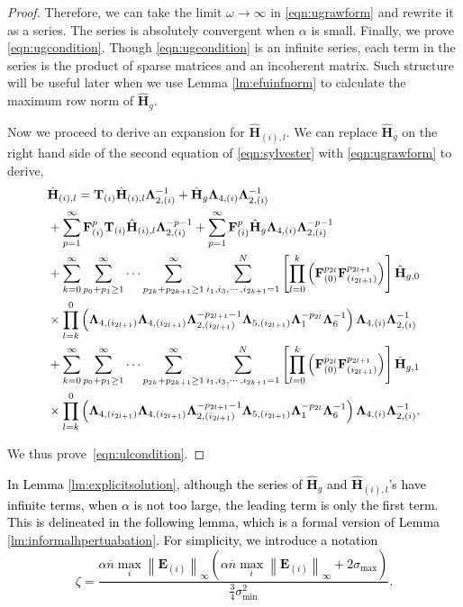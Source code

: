 \documentclass[twoside,11pt]{article}
\newcommand{\revise}[1]{\textcolor{black}{ #1}}
\newcommand{\norm}[1]{\left\lVert#1\right\rVert}
\newcommand{\matE}{\mathbf{E}}
\newcommand{\matF}{\mathbf{F}}
\newcommand{\hmatH}{{\hat{\mathbf{H}}}{}}
\newcommand{\matT}{\mathbf{T}}
\newcommand{\matLambda}{\mathbf{\Lambda}}
\newcommand{\gop}{\sigma_{\max}}
\newcommand{\bn}{{\overline{n}}}
\newcommand{\abnb}{\alpha \bn\max_{i}\norm{\matE_{(i)}}_{\infty}}
\newcommand{\sms}{\sigma_{\min}^2}
\begin{document}
\begin{proof}
Therefore, we can take the limit $\omega\to\infty$ in \eqref{eqn:ugrawform} and rewrite it as a series. The series is absolutely convergent when $\alpha$ is small. Finally, we prove \eqref{eqn:ugcondition}. Though \eqref{eqn:ugcondition} is an infinite series, each term in the series is the product of sparse matrices and an incoherent matrix. Such structure will be useful later when we use Lemma \ref{lm:efuinfnorm} to calculate the maximum row norm of $\hmatH_g$. 

Now we proceed to derive an expansion for $\hmatH_{(i),l}$. We can replace $\hmatH_g$ on the right hand side of the second equation of \eqref{eqn:sylvester} with \eqref{eqn:ugrawform} to derive,
\begin{align}
&\hmatH_{(i),l}=\matT_{(i)}\hmatH_{(i),l}\matLambda_{2,(i)}^{-1}+\hmatH_{g}\matLambda_{4,(i)}\matLambda_{2,(i)}^{-1}\notag\\
&+\sum_{p=1}^{\infty}\matF_{(i)}^p\matT_{(i)}\hmatH_{(i),l}\matLambda_{2,(i)}^{-p-1}+\sum_{p=1}^{\infty}\matF_{(i)}^p\hmatH_{g}\matLambda_{4,(i)}\matLambda_{2,(i)}^{-p-1}\notag\\
&+\sum_{k=0}^\infty\sum_{p_0+p_1\ge 1}^{\infty}\cdots\sum_{p_{2k}+p_{2k+1}\ge 1}^{\infty}\sum_{i_1,i_3,\cdots,i_{2k+1}=1}^N\left[\prod_{l=0}^{k}\left(\matF_{(0)}^{p_{2l}}\matF_{(i_{2l+1})}^{p_{2l+1}}\right)\right]\hmatH_{g,0}\notag\\
&\times \prod_{l=k}^0\left(\matLambda_{4,(i_{2l+1})}\matLambda_{4,(i_{2l+1})}\matLambda_{2,(i_{2l+1})}^{-p_{2l+1}-1}\matLambda_{5,(i_{2l+1})}\matLambda_{1}^{-p_{2l}}\matLambda_6^{-1}\right)\matLambda_{4,(i)}\matLambda_{2,(i)}^{-1}\notag\\
&+\sum_{k=0}^\infty\sum_{p_0+p_1\ge 1}^{\infty}\cdots\sum_{p_{2k}+p_{2k+1}\ge 1}^{\infty}\sum_{i_1,i_3,\cdots,i_{2k+1}=1}^N\left[\prod_{l=0}^{k}\left(\matF_{(0)}^{p_{2l}}\matF_{(i_{2l+1})}^{p_{2l+1}}\right)\right]\hmatH_{g,1}\notag\\
&\times \prod_{l=k}^0\left(\matLambda_{4,(i_{2l+1})}\matLambda_{4,(i_{2l+1})}\matLambda_{2,(i_{2l+1})}^{-p_{2l+1}-1}\matLambda_{5,(i_{2l+1})}\matLambda_{1}^{-p_{2l}}\matLambda_6^{-1}\right)\matLambda_{4,(i)}\matLambda_{2,(i)}^{-1}.\notag\\
\label{eqn:uirawform}
\end{align}

We thus prove~\eqref{eqn:ulcondition}.
\end{proof}

\revise{In Lemma \ref{lm:explicitsolution},  although the series of $\hmatH_g$ and $\hmatH_{(i),l}$'s have infinite terms, when $\alpha$ is not too large, the leading term is only the first term. This is delineated in the following lemma, which is a formal version of Lemma \ref{lm:informalhpertuabation}. For simplicity, we introduce a notation
\begin{equation}
\label{eqn:zetadef}
    \zeta = \frac{\abnb\left(\abnb+2\gop\right)}{\frac{3}{4}\sms}.
\end{equation}}
\end{document}
